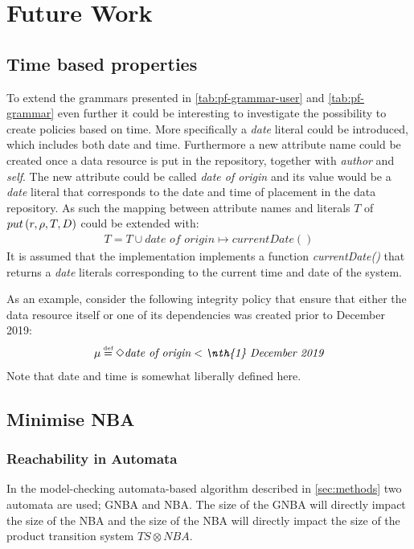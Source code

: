\section{Future Work}\label{sec:future-work}
\subsection{Time based properties}
To extend the grammars presented in \autoref{tab:pf-grammar-user} and \autoref{tab:pf-grammar} even further it could be interesting to investigate the possibility to create policies based on time. More specifically a \emph{date} literal could be introduced, which includes both date and time. Furthermore a new attribute name could be created once a data resource is put in the repository, together with \emph{author} and \emph{self}. The new attribute could be called \emph{date of origin} and its value would be a \emph{date} literal that corresponds to the date and time of placement in the data repository. As such the mapping between attribute names and literals $T$ of $put \left( r, \rho, T, D \right)$ could be extended with:
\begin{align*}
    T = T \cup \textit{date of origin} \mapsto currentDate()
\end{align*}
It is assumed that the implementation implements a function \emph{currentDate()} that returns a \emph{date} literals corresponding to the current time and date of the system.

As an example, consider the following integrity policy that ensure that either the data resource itself or one of its dependencies was created prior to  December 2019:
\begin{align*}
    \inte \eqdef \F \textit{date of origin} < \textit{\nth{1} December 2019}
\end{align*}
Note that date and time is somewhat liberally defined here.

\subsection{Minimise NBA}
\subsubsection{Reachability in Automata}\label{sec:reach}
In the model-checking automata-based algorithm described in \autoref{sec:methods} two automata are used; GNBA and NBA. The size of the GNBA will directly impact the size of the NBA and the size of the NBA will directly impact the size of the product transition system $TS \otimes NBA$. 

